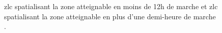 \begin{figure}
  \centering
  \hspace{1cm}
  \caption{\ac{zlc} spatialisant la zone atteignable en moins de 12h
    de marche \protect{} et \ac{zlc}
    spatialisant la zone atteignable en plus d'une demi-heure de
    marche \protect{}.}
  \label{fig:ZLC_1_2_TempsMarche}
\end{figure}

